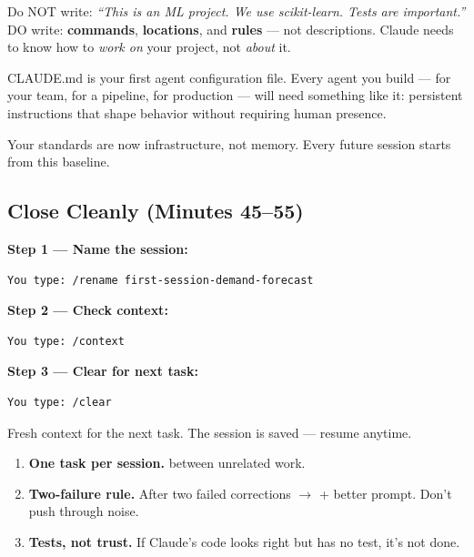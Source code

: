 \documentclass[10pt,oneside]{scrartcl}
\begin{document}
\begin{warnbox}
Do NOT write: \emph{``This is an ML project. We use scikit-learn. Tests are important.''}\\
DO write: \textbf{commands}, \textbf{locations}, and \textbf{rules} --- not descriptions.
Claude needs to know how to \emph{work on} your project, not \emph{about} it.
\end{warnbox}

\begin{tipbox}
CLAUDE.md is your first agent configuration file. Every agent you build --- for your team, for a pipeline, for production --- will need something like it: persistent instructions that shape behavior without requiring human presence.
\end{tipbox}

Your standards are now infrastructure, not memory. Every future session starts from this baseline.

\subsection{Close Cleanly (Minutes 45--55)}

\textbf{Step 1 --- Name the session:}

\begin{verbatim}
You type: /rename first-session-demand-forecast
\end{verbatim}


\textbf{Step 2 --- Check context:}

\begin{verbatim}
You type: /context
\end{verbatim}

\textbf{Step 3 --- Clear for next task:}

\begin{verbatim}
You type: /clear
\end{verbatim}


Fresh context for the next task. The session is saved --- resume anytime.

\begin{keybox}
\begin{enumerate}
  \item \textbf{One task per session.}  between unrelated work.
  \item \textbf{Two-failure rule.} After two failed corrections $\rightarrow$  + better prompt. Don't push through noise.
  \item \textbf{Tests, not trust.} If Claude's code looks right but has no test, it's not done.
\end{enumerate}
\end{keybox}
\end{document}

